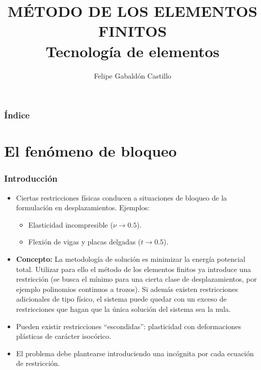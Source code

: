 \documentclass{beamer}
\title[Tecnología de elementos]{MÉTODO DE LOS ELEMENTOS FINITOS \\
Tecnología de elementos}
\author[F. Gabaldón]{Felipe Gabaldón Castillo}
\date{}
\begin{document}
\begin{frame}
\titlepage
\end{frame}
\begin{frame}
\frametitle{Índice}
\tableofcontents
\end{frame}
\section{El fenómeno de bloqueo}
\begin{frame}
\frametitle{Introducción}
\begin{itemize}
\item Ciertas restricciones físicas conducen a situaciones de bloqueo de
la formulación en desplazamientos. Ejemplos:
\begin{itemize}
\item Elasticidad incompresible ($\nu \rightarrow 0.5$).
\item Flexión de vigas y placas delgadas ($t \rightarrow 0.5$).
\end{itemize}
\item {\bf Concepto:} La
metodología de solución es minimizar la energía
potencial total. Utilizar para ello el método de los elementos finitos
ya introduce una restricción (se busca el mínimo para una cierta clase de
desplazamientos, por ejemplo polinomios continuos a trozos). Si además existen
restricciones adicionales de tipo físico, el sistema puede quedar con un
exceso de restricciones que hagan que la única solución del sistema sea
la nula.
\item Pueden existir restricciones ``escondidas'':
plasticidad con deformaciones plásticas de carácter isocórico.
\item El problema debe plantearse introduciendo una incógnita por cada ecuación
de restricción.
\end{itemize}
\end{frame}
\end{document}
